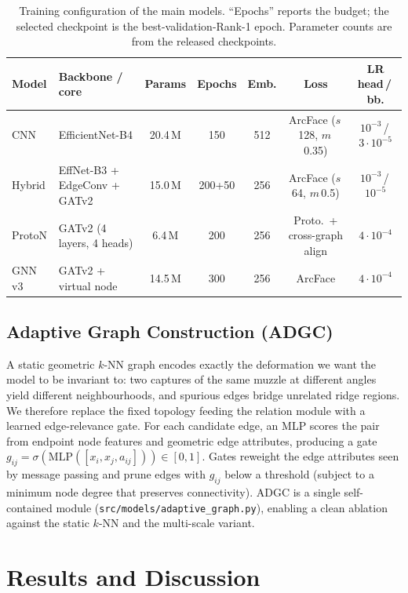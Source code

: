 \documentclass[11pt]{article}
\begin{document}
\begin{table}[t]
  \centering
  \caption{Training configuration of the main models. ``Epochs'' reports the budget; the
  selected checkpoint is the best-validation-Rank-1 epoch. Parameter counts are from the
  released checkpoints.}
  \label{tab:trainsetup}
  \footnotesize
  \setlength{\tabcolsep}{3.5pt}
  \begin{tabular}{llccccc}
    \toprule
    Model & Backbone / core & Params & Epochs & Emb. & Loss & LR head\,/\,bb. \\
    \midrule
    CNN & EfficientNet-B4 & 20.4\,M & 150 & 512 & ArcFace ($s$\,128, $m$\,0.35) & $10^{-3}$\,/\,$3{\cdot}10^{-5}$ \\
    Hybrid & EffNet-B3 + EdgeConv + GATv2 & 15.0\,M & 200+50 & 256 & ArcFace ($s$\,64, $m$\,0.5) & $10^{-3}$\,/\,$10^{-5}$ \\
    ProtoN & GATv2 (4 layers, 4 heads) & 6.4\,M & 200 & 256 & Proto.\ + cross-graph align & $4{\cdot}10^{-4}$ \\
    GNN v3 & GATv2 + virtual node & 14.5\,M & 300 & 256 & ArcFace & $4{\cdot}10^{-4}$ \\
    \bottomrule
  \end{tabular}
\end{table}

\subsection{Adaptive Graph Construction (ADGC)}
A static geometric $k$-NN graph encodes exactly the deformation we want the model to be
invariant to: two captures of the same muzzle at different angles yield different
neighbourhoods, and spurious edges bridge unrelated ridge regions. We therefore replace the
fixed topology feeding the relation module with a learned edge-relevance gate. For each
candidate edge, an MLP scores the pair from endpoint node features and geometric edge
attributes, producing a gate $g_{ij}=\sigma(\text{MLP}([x_i,x_j,a_{ij}]))\in[0,1]$. Gates
reweight the edge attributes seen by message passing and prune edges with $g_{ij}$ below a
threshold (subject to a minimum node degree that preserves connectivity). ADGC is a single
self-contained module (\texttt{src/models/adaptive\_graph.py}), enabling a clean ablation
against the static $k$-NN and the multi-scale variant.

\section{Results and Discussion}
\end{document}
